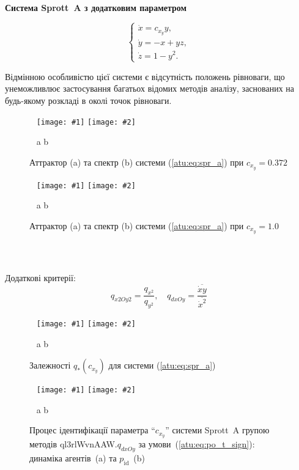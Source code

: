 \documentclass[14pt,handout,utf8]{beamer}
\newcommand{\Xhead}[1]{
 \begin{center}%
      \textbf{#1}%
 \end{center}%
}
\newcommand{\ABlbl}{%
  \vspace{-2.7ex}
  \begin{center}
    ~ \hfill a \hfill\hfill b \hfill ~
  \end{center}
  \vspace{-2.0ex}
}
\newcommand{\PicDouble}[2]{%
 \begin{center}
    ~ \hfill
    \texttt{[image: \#1]}
    \hfill
    \texttt{[image: \#2]}
    \hfill ~
  \end{center}
  \ABlbl
}
\begin{document}

\begin{frame}
  \frametitle{~}

  \Xhead{Система Sprott~A з додатковим параметром}

  \begin{equation}
    \begin{cases}
      \dot{x} =  c_{x_y} y, \\
      \dot{y} = -x + yz, \\
      \dot{z} =  1 - y^2.
    \end{cases}
    \label{atu:eq:spr_a}
  \end{equation}

Відмінною особливістю цієї системи є відсутність положень рівноваги, що унеможливлює
застосування багатьох відомих методів аналізу, заснованих на будь-якому
розкладі в околі точок рівноваги.

  \begin{figure}
    \PicDouble{../p5/p/cha/spr_a/sprott_a-p_xyz_cx_y=0x372.png}{../p5/p/cha/spr_a/sprott_a_f-p_f_cx_y=0x372.png}
    \caption{Аттрактор (a) та спектр (b) системи (\ref{atu:eq:spr_a}) при $c_{x_y} =0.372$}
    \label{atu:f:spr_a_p_0372}
  \end{figure}

  \begin{figure}[htb!]
    \PicDouble{../p5/p/cha/spr_a/sprott_a-p_xyz_cx_y=1x000.png}{../p5/p/cha/spr_a/sprott_a_f-p_f_cx_y=1x000.png}
    \caption{Аттрактор (a) та спектр (b) системи (\ref{atu:eq:spr_a}) при $c_{x_y} =1.0$}
    \label{atu:f:spr_a_p_1000}
  \end{figure}

\end{frame}


\begin{frame}
  \frametitle{~}

  Додаткові критерії:
  \[
    q_{x2Oy2} = \frac{q_{x^2}}{q_{y^2}},
    \quad
    q_{dxOy} =
    \frac{\overline{\dot{x}y}}{\overline{\dot{x}^2}}
  \]

\begin{figure}
  \PicDouble{../p5/p/cha/spr_a/sprott_a_q-p_c_x_y.png}{../p5/p/cha/spr_a/sprott_a_q2-p_c_x_y2.png}
  \caption{Залежності $q_{*}(c_{x_y})$ для системи (\ref{atu:eq:spr_a})}
  \label{atu:f:spr_a_q}
\end{figure}

  \begin{figure}[htb!]
    \PicDouble{../p5/p/cha/spr_a/ql3rlWvnAAW_dxOy/sprott_a_id2-p_t_pi_ql3rlWvnAAW_sign.png}{../p5/p/cha/spr_a/ql3rlWvnAAW_dxOy/sprott_a_id2-p_t_p_ql3rlWvnAAW_sign.png}
    \caption{Процес ідентифікації параметра ``$c_{x_y}$'' системи Sprott~A групою методів ql3rlWvnAAW.$q_{dxOy}$ за умови~(\ref{atu:eq:po_t_sign}): динаміка агентів~(a) та $p_\mathrm{id}$~(b)}
    \label{atu:f:spr_a_id_ql3rlWvnAAW_q_dxOy_sign}
  \end{figure}


\end{frame}
\end{document}
